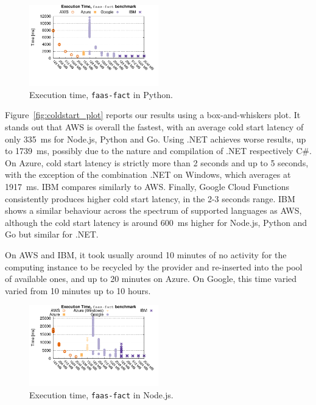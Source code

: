 \begin{figure}[!t]
\centering
\includegraphics[width=0.5\textwidth, trim={0 40 0 0}]{bilder/general_python/cpufact.pdf}
\caption{Execution time, \texttt{faas-fact} in Python.}
\label{fig:general_python_plot}
\end{figure}

Figure~\ref{fig:coldstart_plot} reports our results using a box-and-whiskers plot.
It stands out that \gls{AWS} is overall the fastest, with an average cold start latency of only 335~ms for Node.js, Python and Go. 
Using .NET achieves worse results, up to 1739~ms, possibly due to the nature and compilation of .NET respectively C\#. 
On Azure, cold start latency is strictly more than 2 seconds and up to 5 seconds, with the exception of the combination .NET on Windows, which averages at 1917~ms. 
IBM compares similarly to \gls{AWS}.
Finally, Google Cloud Functions consistently produces higher cold start latency, in the 2-3 seconds range. 
\gls{IBM} shows a similar behaviour across the spectrum of supported languages as \gls{AWS},  although the cold start latency is around 600~ms higher for Node.js, Python and Go but similar for .NET.

On \gls{AWS} and \gls{IBM}, it took usually around 10 minutes of no activity for the computing instance to be recycled by the provider and re-inserted into the pool of available ones, and up to 20 minutes on Azure. 
On Google, this time varied varied from 10 minutes up to 10 hours. %




\begin{figure}[!t]
\centering
\includegraphics[width=0.5\textwidth, trim={0 40 0 0}]{bilder/general_node/cpufact.pdf}
\caption{Execution time, \texttt{faas-fact} in Node.js.}
\label{fig:general_node_plot}
\end{figure}

